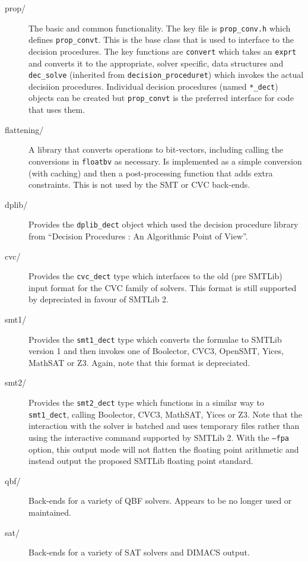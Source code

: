\documentclass{article}
\newcommand{\dir}[1]{\texttt{#1}}
\newcommand{\file}[1]{\texttt{#1}}
\newcommand{\code}[1]{\texttt{#1}}
\begin{document}
\begin{description}

  \item[prop/]{The basic and common functionality.  The key file is
    \file{prop\_conv.h} which defines \code{prop\_convt}.  This is the
     base class that is used to interface to the decision procedures.
     The key functions are \code{convert} which takes an \code{exprt}
     and converts it to the appropriate, solver specific, data
     structures and \code{dec\_solve} (inherited from
     \code{decision\_proceduret}) which invokes the actual decisiion
     procedures.  Individual decision procedures (named
     \code{*\_dect}) objects can be created but \code{prop\_convt} is
     the preferred interface for code that uses them.}  

  \item[flattening/]{A library that converts operations to
    bit-vectors, including calling the conversions in \dir{floatbv} as
    necessary.  Is implemented as a simple conversion (with caching)
    and then a post-processing function that adds extra constraints.
    This is not used by the SMT or CVC back-ends.}  


  \item[dplib/]{Provides the \code{dplib\_dect} object which used the
    decision procedure library from ``Decision Procedures : An
    Algorithmic Point of View''.}  

  \item[cvc/]{Provides the \code{cvc\_dect} type which interfaces to
    the old (pre SMTLib) input format for the CVC family of solvers.
    This format is still supported by depreciated in favour of SMTLib 2.}  

  \item[smt1/]{Provides the \code{smt1\_dect} type which converts the
    formulae to SMTLib version 1 and then invokes one of Boolector,
    CVC3, OpenSMT, Yices, MathSAT or Z3.  Again, note that this format
    is depreciated.}  

  \item[smt2/]{Provides the \code{smt2\_dect} type which functions in
    a similar way to \code{smt1\_dect}, calling Boolector, CVC3,
    MathSAT, Yices or Z3.  Note that the interaction with the solver
    is batched and uses temporary files rather than using the
    interactive command supported by SMTLib 2.  With the \code{--fpa}
    option, this output mode will not flatten the floating point
    arithmetic and instead output the proposed SMTLib floating point
    standard.}
  
  \item[qbf/]{Back-ends for a variety of QBF solvers.  Appears to be
    no longer used or maintained.}
  
  \item[sat/]{Back-ends for a variety of SAT solvers and DIMACS
    output.}  
\end{description}
\end{document}
